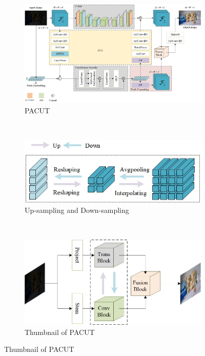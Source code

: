 \documentclass[a4paper]{ctexart}
\begin{document}
	\begin{figure}[htb] 
		\centering 
		
		\begin{subfigure}{\textwidth}
			\includegraphics[width=\linewidth]{picture/LLIE/My Architecture/The proposed initial architecture.jpg}
			\captionsetup{font=scriptsize}
			\caption{PACUT}
			\label{fig: First Architecture}
		\end{subfigure}\\
		\begin{subfigure}{0.4\textwidth}
			\includegraphics[width=\linewidth]{picture/LLIE/My Architecture/Up-sampling and down-sampling}
			\captionsetup{font=scriptsize}
			\caption{Up-sampling and Down-sampling}
			\label{fig: Up-sampling and down-sampling}
		\end{subfigure} \
		\begin{subfigure}{0.4\textwidth}
			\includegraphics[width=\linewidth]{picture/LLIE/My Architecture/The proposed initial architecture(Abstract Picture)}
			\captionsetup{font=scriptsize}
			\caption{Thumbnail of PACUT}
			\label{fig: The proposed initial architecture(Abstract Picture)}	
		\end{subfigure}
		

\end{figure}
\end{document}
